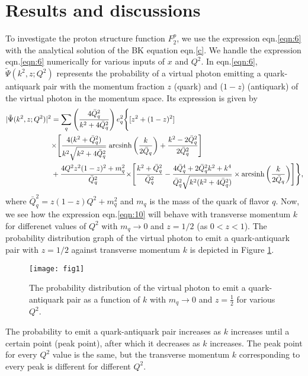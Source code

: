 \documentclass[12pt]{article}
\begin{document}
\section{Results and discussions} \label{sec:results}
To investigate the proton structure function $F_2 ^p$, we use the expression eqn.\eqref{eqn:6} with the analytical solution of the BK equation eqn.\eqref{c}. We handle the expression eqn.\eqref{eqn:6} numerically for various inputs of $x$ and $Q^2$. In eqn.\eqref{eqn:6}, $\tilde{\Psi} (k^2 , z; Q^2)$ represents the probability of a virtual photon emitting a quark-antiquark pair with the momentum fraction $z$ (quark) and ($1-z$) (antiquark) of the virtual photon in the momentum space. Its expression is given by~\cite{ac}
\begin{equation}\label{eqn:10}
	\begin{aligned}
		|\tilde{\Psi}(k^2,z;Q^2)|^2 & = \sum_{q} \left(\frac{4\bar{Q}^2 _q}{k^2 + 4\bar{Q}^2 _q}\right) e^2 _q \Biggl\{[z^2 + (1-z)^2]\\
		& \times \Biggr[\frac{4(k^2+\bar{Q}^2 _q)}{k^2\sqrt{k^2 + 4\bar{Q}^2 _q}} \hspace{1mm}\text{arcsinh}\left(\frac{k}{2\bar{Q}_q}\right)+\frac{k^2 - 2\bar{Q}^2 _q}{2\bar{Q}^2 _q}\Biggr]\\
		& + \frac{4Q^2 z^2 (1-z)^2 + m^2 _q}{\bar{Q}^2 _q} \times \Biggr[\frac{k^2 + \bar{Q}^2 _q}{\bar{Q}^2 _q}-\frac{4\bar{Q}^4 _q + 2\bar{Q}^2 _q k^2 + k^4}{\bar{Q}^2 _q \sqrt{k^2 (k^2 + 4\bar{Q}^2 _q)}} \times \text{arcsinh}\left(\frac{k}{2\bar{Q}_q}\right)
		\Biggr] \Biggl\},
	\end{aligned}
\end{equation}
where $\bar{Q}_q ^2 = z(1-z)Q^2 + m_q ^2$ and $m_q$ is the mass of the quark of flavor $q$. Now, we see how the expression eqn.\eqref{eqn:10} will behave with transverse momentum $k$ for differenet values of $Q^2$ with $m_q \to 0$ and $z = 1/2$ (as $0 < z < 1$). The probability distribution graph of the virtual photon to emit a quark-antiquark pair with $z=1/2$ against transverse momentum $k$ is depicted in Figure \ref{fig:1}.
\begin{figure}[h]
	\centering
	\texttt{[image: fig1]}
	\caption{\label{fig:1} The probability distribution of the virtual photon to emit a quark-antiquark pair as a function of $k$ with $m_q \to 0$ and $z = \frac{1}{2}$ for various $Q^2$.}
\end{figure} 
The probability to emit a quark-antiquark pair increases as $k$ increases until a certain point (peak point), after which it decreases as $k$ increases. The peak point for every $Q^2$ value is the same, but the transverse momentum $k$ corresponding to every peak is different for different $Q^2$.
\end{document}
